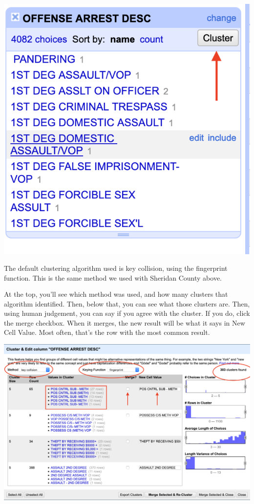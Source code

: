 \documentclass[]{book}
\begin{document}
\includegraphics[width=8.42in]{images/open4}

The default clustering algorithm used is key collision, using the fingerprint function. This is the same method we used with Sheridan County above.

At the top, you'll see which method was used, and how many clusters that algorithm identified. Then, below that, you can see what those clusters are. Then, using human judgement, you can say if you agree with the cluster. If you do, click the merge checkbox. When it merges, the new result will be what it says in New Cell Value. Most often, that's the row with the most common result.

\includegraphics[width=27.78in]{images/open6}
\end{document}
